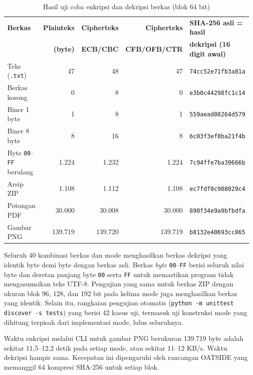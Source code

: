 \begin{table}[H]
    \centering
    \small
    \caption{Hasil uji coba enkripsi dan dekripsi berkas (blok 64 bit)}
    \label{tab:hasil_uji}
    \begin{tabular}{@{}lrrrl@{}}
        \toprule
        \textbf{Berkas} & \textbf{Plainteks} & \textbf{Cipherteks} & \textbf{Cipherteks} & \textbf{SHA-256 asli = hasil} \\
         & \textbf{(byte)} & \textbf{ECB/CBC} & \textbf{CFB/OFB/CTR} & \textbf{dekripsi (16 digit awal)} \\
        \midrule
        Teks (\texttt{.txt}) & 47 & 48 & 47 & \texttt{74cc52e71fb3a81a} \\
        Berkas kosong & 0 & 8 & 0 & \texttt{e3b0c44298fc1c14} \\
        Biner 1 byte & 1 & 8 & 1 & \texttt{559aead08264d579} \\
        Biner 8 byte & 8 & 16 & 8 & \texttt{6c03f3ef0ba21f4b} \\
        Byte \texttt{00}--\texttt{FF} berulang & 1.224 & 1.232 & 1.224 & \texttt{7c94ffe7ba39666b} \\
        Arsip ZIP & 1.108 & 1.112 & 1.108 & \texttt{ec7fdf0c908029c4} \\
        Potongan PDF & 30.000 & 30.008 & 30.000 & \texttt{890f34e9a9bfbdfa} \\
        Gambar PNG & 139.719 & 139.720 & 139.719 & \texttt{b8132e40693cc865} \\
        \bottomrule
    \end{tabular}
\end{table}

Seluruh 40 kombinasi berkas dan mode menghasilkan berkas dekripsi yang identik byte demi byte dengan berkas asli. Berkas \textit{byte} \texttt{00}--\texttt{FF} berisi seluruh nilai byte dan deretan panjang byte \texttt{00} serta \texttt{FF} untuk memastikan program tidak mengasumsikan teks UTF-8. Pengujian yang sama untuk berkas ZIP dengan ukuran blok 96, 128, dan 192 bit pada kelima mode juga menghasilkan berkas yang identik. Selain itu, rangkaian pengujian otomatis (\texttt{python -m unittest discover -s tests}) yang berisi 42 kasus uji, termasuk uji konstruksi mode yang dihitung terpisah dari implementasi mode, lulus seluruhnya.

Waktu enkripsi melalui CLI untuk gambar PNG berukuran 139.719 byte adalah sekitar 11,5--12,2 detik pada setiap mode, atau sekitar 11--12 KB/s. Waktu dekripsi hampir sama. Kecepatan ini dipengaruhi oleh rancangan OATSIDE yang memanggil 64 kompresi SHA-256 untuk setiap blok.

